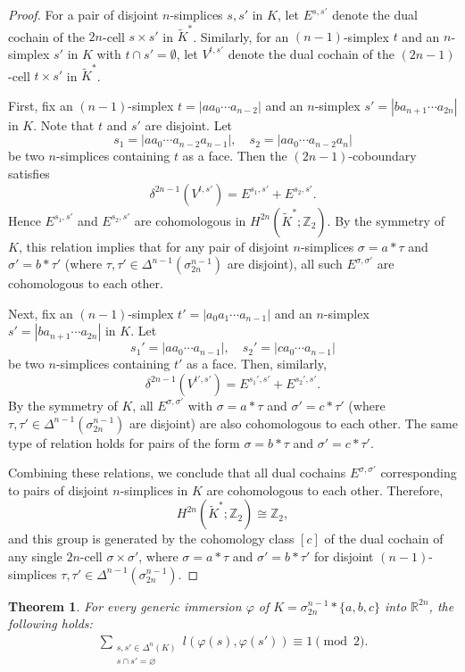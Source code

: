 \documentclass{amsart}
\newtheorem{Theorem}{Theorem}[section]
\theoremstyle{definition}
\theoremstyle{remark}
\numberwithin{equation}{section}
\begin{document}
\begin{proof}
For a pair of disjoint $n$-simplices $s,s'$ in $K$, let $E^{s,s'}$ denote the dual cochain of the $2n$-cell $s \times s'$ in $\widetilde{K}^*$. Similarly, for an $(n-1)$-simplex $t$ and an $n$-simplex $s'$ in $K$ with $t \cap s' = \emptyset$, let $V^{t,s'}$ denote the dual cochain of the $(2n-1)$-cell $t \times s'$ in $\widetilde{K}^*$.

First, fix an $(n-1)$-simplex $t = |a a_0 \cdots a_{n-2}|$ and an $n$-simplex $s' = |b a_{n+1} \cdots a_{2n}|$ in $K$. Note that $t$ and $s'$ are disjoint. Let 
\[
s_1 = |a a_0 \cdots a_{n-2} a_{n-1}|, \quad s_2 = |a a_0 \cdots a_{n-2} a_n|
\]
be two $n$-simplices containing $t$ as a face. Then the $(2n-1)$-coboundary satisfies
\[
\delta^{2n-1}(V^{t,s'}) = E^{s_1,s'} + E^{s_2,s'}.
\]
Hence $E^{s_1,s'}$ and $E^{s_2,s'}$ are cohomologous in $H^{2n}(\widetilde{K}^*;\mathbb{Z}_2)$. By the symmetry of $K$, this relation implies that for any pair of disjoint $n$-simplices $\sigma = a*\tau$ and $\sigma' = b*\tau'$ (where $\tau,\tau'\in\varDelta^{n-1}(\sigma_{2n}^{n-1})$ are disjoint), all such $E^{\sigma,\sigma'}$ are cohomologous to each other.


Next, fix an $(n-1)$-simplex $t' = |a_0 a_1 \cdots a_{n-1}|$ and an $n$-simplex $s' = |b a_{n+1} \cdots a_{2n}|$ in $K$. Let 
\[
s_1' = |a a_0 \cdots a_{n-1}|, \quad s_2' = |c a_0 \cdots a_{n-1}|
\]
be two $n$-simplices containing $t'$ as a face. Then, similarly,
\[
\delta^{2n-1}(V^{t',s'}) = E^{s_1',s'} + E^{s_2',s'}.
\]
By the symmetry of $K$, all $E^{\sigma,\sigma'}$ with $\sigma = a*\tau$ and $\sigma' = c*\tau'$ (where $\tau,\tau'\in\varDelta^{n-1}(\sigma_{2n}^{n-1})$ are disjoint) are also cohomologous to each other. The same type of relation holds for pairs of the form $\sigma = b*\tau$ and $\sigma' = c*\tau'$.


Combining these relations, we conclude that all dual cochains $E^{\sigma,\sigma'}$ corresponding to pairs of disjoint $n$-simplices in $K$ are cohomologous to each other. Therefore,
\[
H^{2n}(\widetilde{K}^*;\mathbb{Z}_2) \cong \mathbb{Z}_2,
\]
and this group is generated by the cohomology class $[c]$ of the dual cochain of any single $2n$-cell $\sigma \times \sigma'$, where $\sigma = a*\tau$ and $\sigma' = b*\tau'$ for disjoint $(n-1)$-simplices $\tau,\tau'\in\varDelta^{n-1}(\sigma_{2n}^{n-1})$. 
\end{proof}


\begin{Theorem}\label{vko}
For every generic immersion $\varphi$ of $K = \sigma_{2n}^{n-1}*\{a,b,c\}$ into $\mathbb{R}^{2n}$, the following holds:
\begin{eqnarray*}
\sum_{\substack{s,s'\in\varDelta^{n}(K)\\ s\cap s'=\varnothing}} l(\varphi(s),\varphi(s')) \equiv 1 \pmod{2}.
\end{eqnarray*}
\end{Theorem}
\end{document}
